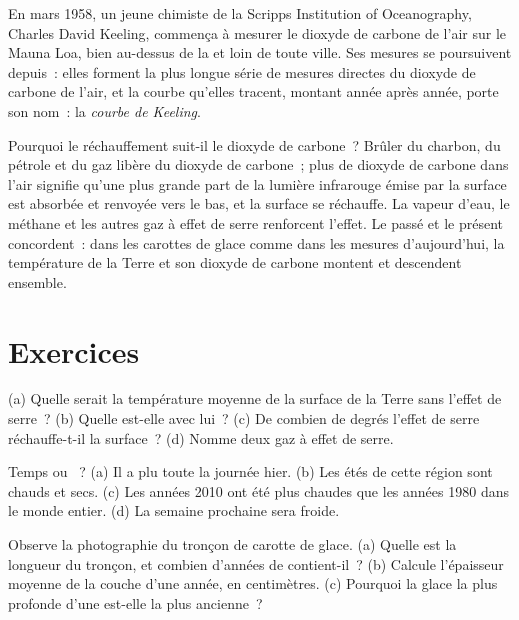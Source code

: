 \begin{history}
En mars 1958, un jeune chimiste de la Scripps Institution of Oceanography,
Charles David Keeling, commença à mesurer le dioxyde de carbone de l'air
sur le Mauna Loa, bien au-dessus de la  et loin de toute ville. Ses
mesures se poursuivent depuis~: elles forment la plus longue série de
mesures directes du dioxyde de carbone de l'air, et la courbe qu'elles
tracent, montant année après année, porte son nom~: la \emph{courbe de
Keeling}.
\end{history}

Pourquoi le réchauffement suit-il le dioxyde de carbone~? Brûler du
charbon, du pétrole et du gaz libère du dioxyde de carbone~; plus de
dioxyde de carbone dans l'air signifie qu'une plus grande part de la
lumière infrarouge émise par la surface est absorbée et renvoyée vers le
bas, et la surface se réchauffe. La vapeur d'eau, le méthane et les autres
gaz à effet de serre renforcent l'effet. Le passé et le présent
concordent~: dans les carottes de glace comme dans les mesures
d'aujourd'hui, la température de la Terre et son dioxyde de carbone
montent et descendent ensemble.

\section{Exercices}

\begin{exercise}[$\star$]\label{exo:g9:climate-past-and-present:1}
(a) Quelle serait la température moyenne de la surface de la Terre sans
l'effet de serre~? (b) Quelle est-elle avec lui~? (c) De combien de
degrés l'effet de serre réchauffe-t-il la surface~? (d) Nomme deux gaz à
effet de serre.
\end{exercise}

\begin{exercise}[$\star$]\label{exo:g9:climate-past-and-present:2}
Temps ou ~? (a) Il a plu toute la journée hier. (b) Les étés de
cette région sont chauds et secs. (c) Les années 2010 ont été plus
chaudes que les années 1980 dans le monde entier. (d) La semaine
prochaine sera froide.
\end{exercise}

\begin{exercise}[$\star$]\label{exo:g9:climate-past-and-present:3}
Observe la photographie du tronçon de carotte de glace. (a) Quelle est la
longueur du tronçon, et combien d'années de  contient-il~? (b) Calcule
l'épaisseur moyenne de la couche d'une année, en centimètres. (c) Pourquoi
la glace la plus profonde d'une  est-elle la plus
ancienne~?
\end{exercise}

